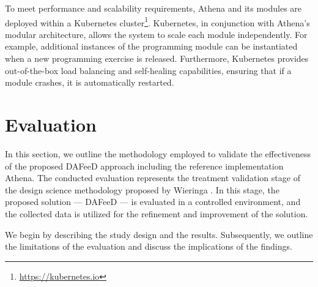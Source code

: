 \documentclass[manuscript,screen,review]{acmart}
\begin{document}
To meet performance and scalability requirements, Athena and its modules are deployed within a Kubernetes cluster\footnote{\url{https://kubernetes.io}}.
Kubernetes, in conjunction with Athena's modular architecture, allows the system to scale each module independently.
For example, additional instances of the programming module can be instantiated when a new programming exercise is released.
Furthermore, Kubernetes provides out-of-the-box load balancing and self-healing capabilities, ensuring that if a module crashes, it is automatically restarted.


\section{Evaluation} %
\label{sec:evaluation}

In this section, we outline the methodology employed to validate the effectiveness of the proposed DAFeeD approach including the reference implementation Athena.
The conducted evaluation represents the treatment validation stage of the design science methodology proposed by Wieringa \cite{wieringa:2014:DesignScienceMethodologya}.
In this stage, the proposed solution — DAFeeD — is evaluated in a controlled environment, and the collected data is utilized for the refinement and improvement of the solution.

We begin by describing the study design and the results.
Subsequently, we outline the limitations of the evaluation and discuss the implications of the findings.




\end{document}
